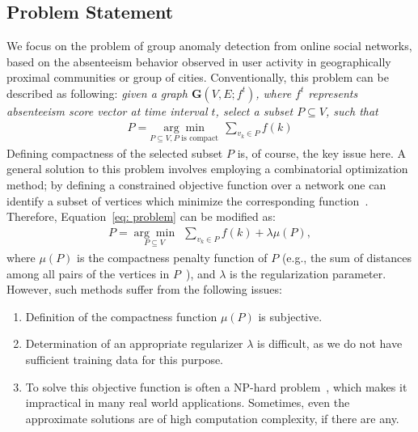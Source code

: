 \documentclass[twoside,leqno,twocolumn]{article}
\begin{document}
\subsection{Problem Statement}
\label{sec:problemformulation}
We focus on the problem of group anomaly detection from online social networks, based on the absenteeism behavior observed in user activity in geographically proximal communities or group of cities.
Conventionally, this problem can be described as following: \emph{given a graph $\mathbf{G}(V,E;f^t)$, where $f^t$ represents \textit{absenteeism score} vector at time interval $t$, select a subset $P \subseteq V$, such that
\begin{eqnarray}
 \label{eq: problem}
    P=\underset{P\subseteq V, P \mbox{ is compact}}{\arg\min}\ \ \sum_{v_k\in P} {f(k)}
\end{eqnarray} }
Defining compactness of the selected subset $P$ is, of course, the key issue here.
A general solution to this problem involves employing a combinatorial optimization method; by defining a constrained objective function over a network one can identify a subset of vertices which minimize the corresponding function~\cite{rozenshtein2014event}. Therefore, Equation~\ref{eq: problem} can be modified as:
\begin{eqnarray}
 \label{eq: problem_conventional}
    P=\underset{P\subseteq V}{\arg\min}\ \ \sum_{v_k\in P} {f(k)}+\lambda \mu(P),
\end{eqnarray}
where $\mu(P)$ is the compactness penalty function of $P$ (e.g., the sum of distances among
all pairs of the vertices in $P$~\cite{rozenshtein2014event}), and $\lambda$ is the regularization parameter.
However, such methods suffer from the following issues:
\begin{enumerate}
\item Definition of the compactness function $\mu(P)$ is subjective.
\item  Determination of an appropriate regularizer $\lambda$ is difficult, as we do not have sufficient training data for this purpose.
\item To solve this objective function is often a NP-hard problem~\cite{rozenshtein2014event}, which makes it impractical in many real world applications. Sometimes, even the approximate solutions are of high computation complexity, if there are any.
\end{enumerate}
\end{document}
